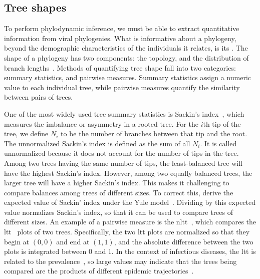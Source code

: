 \subsection{Tree shapes}
\label{subsec:treeshape}

To perform phylodynamic inference, we must be able to extract quantitative
information from viral phylogenies. What is informative about a phylogeny,
beyond the demographic characteristics of the individuals it relates, is its
. The shape of a phylogeny has two components: the topology, and
the distribution of branch lengths~\autocite{mooers1997inferring}. Methods of
quantifying tree shape fall into two categories: summary statistics, and
pairwise measures. Summary statistics assign a numeric value to each individual
tree, while pairwise measures quantify the similarity between pairs of trees. 

One of the most widely used tree summary statistics is Sackin's
index~\autocite{shao1990tree}, which measures the imbalance or asymmetry in a
rooted tree. For the $i$th tip of the tree, we define $N_i$ to be the number of
branches between that tip and the root. The unnormalized Sackin's index is
defined as the sum of all $N_i$. It is called unnormalized because it does not
account for the number of tips in the tree. Among two trees having the same
number of tips, the least-balanced tree will have the highest Sackin's index.
However, among two equally balanced trees, the larger tree will have a higher
Sackin's index. This makes it challenging to compare balances among trees of
different sizes. To correct this, \textcite{kirkpatrick1993searching} derive
the expected value of Sackin' index under the Yule
model~\autocite{yule1925mathematical}. Dividing by this expected value
normalizes Sackin's index, so that it can be used to compare trees of different
sizes. An example of a pairwise measure is the
\gls{nltt}~\autocite{janzen2015approximate}, which compares the
\gls{ltt}~\autocite{nee1992tempo} plots of two trees. Specifically, the two
\gls{ltt} plots are normalized so that they begin at $(0, 0)$ and end at $(1,
1)$, and the absolute difference between the two plots is integrated between 0
and 1. In the context of infectious diseases, the \gls{ltt} is related to the
prevalence~\autocite{holmes1995revealing}, so large values may indicate that
the trees being compared are the products of different epidemic
trajectories~\autocite{janzen2015approximate}.

